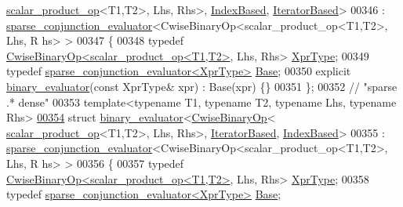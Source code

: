 \begin{DoxyCode}
      \hyperlink{struct_eigen_1_1internal_1_1scalar__product__op}{scalar\_product\_op}<T1,T2>, Lhs, Rhs>, \hyperlink{struct_eigen_1_1internal_1_1_index_based}{IndexBased}, 
      \hyperlink{struct_eigen_1_1internal_1_1_iterator_based}{IteratorBased}>
00346   : \hyperlink{struct_eigen_1_1internal_1_1sparse__conjunction__evaluator}{sparse\_conjunction\_evaluator}<CwiseBinaryOp<scalar\_product\_op<T1,T2>, Lhs, R
      hs> >
00347 \{
00348   \textcolor{keyword}{typedef} \hyperlink{group___core___module_class_eigen_1_1_cwise_binary_op}{CwiseBinaryOp<scalar\_product\_op<T1,T2>}, Lhs, Rhs> 
      \hyperlink{group___core___module_class_eigen_1_1_cwise_binary_op}{XprType};
00349   \textcolor{keyword}{typedef} \hyperlink{struct_eigen_1_1internal_1_1sparse__conjunction__evaluator}{sparse\_conjunction\_evaluator<XprType>} 
      \hyperlink{struct_eigen_1_1internal_1_1sparse__conjunction__evaluator}{Base};
00350   \textcolor{keyword}{explicit} \hyperlink{struct_eigen_1_1internal_1_1binary__evaluator}{binary\_evaluator}(\textcolor{keyword}{const} XprType& xpr) : Base(xpr) \{\}
00351 \};
00352 \textcolor{comment}{// "sparse .* dense"}
00353 \textcolor{keyword}{template}<\textcolor{keyword}{typename} T1, \textcolor{keyword}{typename} T2, \textcolor{keyword}{typename} Lhs, \textcolor{keyword}{typename} Rhs>
\hyperlink{struct_eigen_1_1internal_1_1binary__evaluator_3_01_cwise_binary_op_3_01scalar__product__op_3_01_f2d05246f46046f640624904370b9473}{00354} \textcolor{keyword}{struct }\hyperlink{struct_eigen_1_1internal_1_1binary__evaluator}{binary\_evaluator}<\hyperlink{group___core___module_class_eigen_1_1_cwise_binary_op}{CwiseBinaryOp}<
      \hyperlink{struct_eigen_1_1internal_1_1scalar__product__op}{scalar\_product\_op}<T1,T2>, Lhs, Rhs>, \hyperlink{struct_eigen_1_1internal_1_1_iterator_based}{IteratorBased}, 
      \hyperlink{struct_eigen_1_1internal_1_1_index_based}{IndexBased}>
00355   : \hyperlink{struct_eigen_1_1internal_1_1sparse__conjunction__evaluator}{sparse\_conjunction\_evaluator}<CwiseBinaryOp<scalar\_product\_op<T1,T2>, Lhs, R
      hs> >
00356 \{
00357   \textcolor{keyword}{typedef} \hyperlink{group___core___module_class_eigen_1_1_cwise_binary_op}{CwiseBinaryOp<scalar\_product\_op<T1,T2>}, Lhs, Rhs> 
      \hyperlink{group___core___module_class_eigen_1_1_cwise_binary_op}{XprType};
00358   \textcolor{keyword}{typedef} \hyperlink{struct_eigen_1_1internal_1_1sparse__conjunction__evaluator}{sparse\_conjunction\_evaluator<XprType>} 
      \hyperlink{struct_eigen_1_1internal_1_1sparse__conjunction__evaluator}{Base};

\end{DoxyCode}

